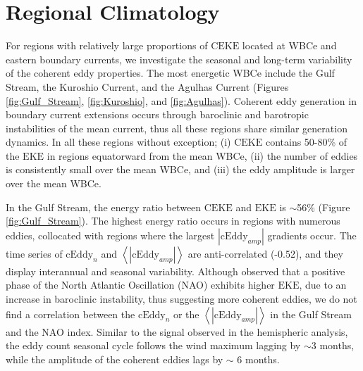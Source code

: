 \documentclass[draft,linenumbers]{agujournal2019}
\newcommand{\EKE}{\textrm{EKE}}
\newcommand{\CEKE}{\textrm{CEKE}}
\newcommand{\cEddy}{\textrm{cEddy}}
\begin{document}
	\section{Regional Climatology}
	\label{sec:CE_regional_stats}
	
	For regions with relatively large proportions of $\CEKE$ located at WBCe and eastern boundary currents, we investigate the seasonal and long-term variability of the coherent eddy properties. The most energetic WBCe include the Gulf Stream, the Kuroshio Current, and the Agulhas Current (Figures \ref{fig:Gulf_Stream}, \ref{fig:Kuroshio}, and \ref{fig:Agulhas}). 
	Coherent eddy generation in boundary current extensions occurs through baroclinic and barotropic instabilities of the mean current, thus all these regions share similar generation dynamics. 
	In all these regions without exception; (i) $\CEKE$ contains 50-80\% of the $\EKE$ in regions equatorward from the mean WBCe, (ii) the number of eddies is consistently small over the mean WBCe, and (iii) the eddy amplitude is larger over the mean WBCe. 

	In the Gulf Stream, the energy ratio between $\CEKE$ and $\EKE$ is $\sim$56\% (Figure \ref{fig:Gulf_Stream}). 
	The highest energy ratio occurs in regions with numerous eddies, collocated with regions where the largest $|\cEddy_{amp}|$ gradients occur. 
	The time series of $\cEddy_{n}$ and $\left<|\cEddy_{amp}|\right>$ are anti-correlated (-0.52), and they display interannual and seasonal variability. 
	Although \citet{Chaudhuri_Oscillation_2009} observed that a positive phase of the North Atlantic Oscillation (NAO) exhibits higher $\EKE$, due to an increase in baroclinic instability, thus suggesting more coherent eddies, we do not find a correlation between the $\cEddy_{n}$ or the $\left<|\cEddy_{amp}|\right>$ in the Gulf Stream and the NAO index. 
	Similar to the signal observed in the hemispheric analysis, the eddy count seasonal cycle follows the wind maximum lagging by $\sim$3 months, while the amplitude of the coherent eddies lags by $\sim$ 6 months. 
\end{document}
